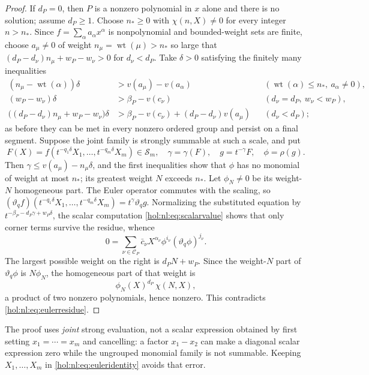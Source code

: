 \documentclass[11pt]{article}
\numberwithin{equation}{section}
\theoremstyle{definition}
\theoremstyle{remark}
\newcommand{\Sfam}{\mathcal S}
\newcommand{\wt}{\operatorname{wt}}
\begin{document}
\begin{proof}
If $d_P=0$, then $P$ is a nonzero polynomial in $x$ alone and there is no
solution; assume $d_P\ge1$. Choose $n_\ast\ge0$ with $\chi(n,X)\ne0$ for every integer $n>n_\ast$. Since
$f=\sum_\alpha a_\alpha x^\alpha$ is nonpolynomial and bounded-weight sets are
finite, choose $a_\mu\ne0$ of weight $n_\mu=\wt(\mu)>n_\ast$ so large that
$(d_P-d_\nu)n_\mu+w_P-w_\nu>0$ for $d_\nu<d_P$. Take $\delta>0$ satisfying
the finitely many inequalities
\begin{align*}
 (n_\mu-\wt(\alpha))\delta&>v(a_\mu)-v(a_\alpha)
 &&(\wt(\alpha)\le n_\ast,\ a_\alpha\ne0),\\
 (w_P-w_\nu)\delta&>\beta_P-v(c_\nu)
 &&(d_\nu=d_P,\ w_\nu<w_P),\\
 \bigl((d_P-d_\nu)n_\mu+w_P-w_\nu\bigr)\delta
 &>\beta_P-v(c_\nu)+(d_P-d_\nu)v(a_\mu)
 &&(d_\nu<d_P);
\end{align*}
as before they can be met in every nonzero ordered group and persist on a
final segment. Suppose the joint family is strongly summable at such a scale,
and put
\[
 F(X)=f(t^{-q_1\delta}X_1,\ldots,t^{-q_m\delta}X_m)\in\Sfam_m,\quad
 \gamma=\gamma(F),\quad g=t^{-\gamma}F,\quad \phi=\rho(g).
\]
Then $\gamma\le v(a_\mu)-n_\mu\delta$, and the first inequalities show that
$\phi$ has no monomial of weight at most $n_\ast$; its greatest weight $N$
exceeds $n_\ast$. Let $\phi_N\ne0$ be its weight-$N$ homogeneous part. The
Euler operator commutes with the scaling, so
$(\vartheta_qf)(t^{-q_1\delta}X_1,\ldots,t^{-q_m\delta}X_m)=t^\gamma\vartheta_qg$.
Normalizing the substituted equation by $t^{-\beta_P-d_P\gamma+w_P\delta}$,
the scalar computation \eqref{hol:nl:eq:scalarvalue} shows that only corner
terms survive the residue, whence
\begin{equation}\label{hol:nl:eq:eulerresidue}
 0=\sum_{\nu\in\mathcal C_P}\bar c_\nu X^{\alpha_\nu}\phi^{i_\nu}
 (\vartheta_q\phi)^{j_\nu}.
\end{equation}
The largest possible weight on the right is $d_PN+w_P$. Since the weight-$N$
part of $\vartheta_q\phi$ is $N\phi_N$, the homogeneous part of that weight is
\begin{equation}\label{hol:nl:eq:euleridentity}
 \phi_N(X)^{d_P}\,\chi(N,X),
\end{equation}
a product of two nonzero polynomials, hence nonzero. This contradicts
\eqref{hol:nl:eq:eulerresidue}.
\end{proof}

The proof uses \emph{joint} strong evaluation, not a scalar expression
obtained by first setting $x_1=\cdots=x_m$ and cancelling: a factor
$x_1-x_2$ can make a diagonal scalar expression zero while the ungrouped
monomial family is not summable. Keeping $X_1,\ldots,X_m$ in
\eqref{hol:nl:eq:euleridentity} avoids that error.
\end{document}

